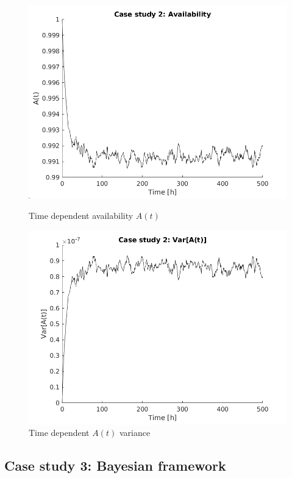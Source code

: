 \documentclass[a4paper,11pt]{article}
\begin{document}
\begin{figure}[ht]
    \centering
    \begin{minipage}{.5\textwidth}
        \centering
        \includegraphics[width=1\linewidth]{Avail2.png}
        \caption{Time dependent availability $A(t)$}
    \end{minipage}%
    \begin{minipage}{.5\textwidth}
        \centering
        \includegraphics[width=1\linewidth]{Avail2_var.png}
        \caption{Time dependent $A(t)$ variance}
    \end{minipage}
\end{figure}

\subsection{Case study 3: Bayesian framework}
\end{document}
